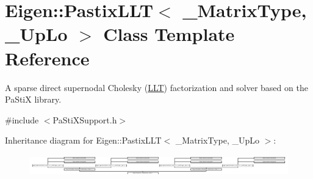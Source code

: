 \hypertarget{class_eigen_1_1_pastix_l_l_t}{}\section{Eigen\+:\+:Pastix\+L\+LT$<$ \+\_\+\+Matrix\+Type, \+\_\+\+Up\+Lo $>$ Class Template Reference}
\label{class_eigen_1_1_pastix_l_l_t}


A sparse direct supernodal Cholesky (\hyperlink{group___cholesky___module_class_eigen_1_1_l_l_t}{L\+LT}) factorization and solver based on the Pa\+StiX library.  




{\ttfamily \#include $<$Pa\+Sti\+X\+Support.\+h$>$}

Inheritance diagram for Eigen\+:\+:Pastix\+L\+LT$<$ \+\_\+\+Matrix\+Type, \+\_\+\+Up\+Lo $>$\+:\begin{figure}[H]
\begin{center}
\leavevmode
\includegraphics[height=0.921053cm]{class_eigen_1_1_pastix_l_l_t}
\end{center}
\end{figure}
